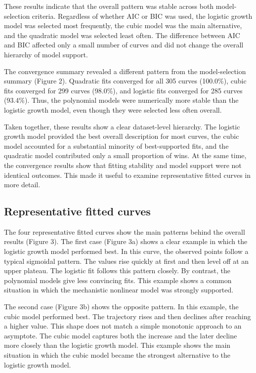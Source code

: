\documentclass[11pt]{article}
\begin{document}
These results indicate that the overall pattern was stable across both model-selection criteria. Regardless of whether AIC or BIC was used, the logistic growth model was selected most frequently, the cubic model was the main alternative, and the quadratic model was selected least often. The difference between AIC and BIC affected only a small number of curves and did not change the overall hierarchy of model support.



The convergence summary revealed a different pattern from the model-selection summary (Figure 2). Quadratic fits converged for all 305 curves (100.0\%), cubic fits converged for 299 curves (98.0\%), and logistic fits converged for 285 curves (93.4\%). Thus, the polynomial models were numerically more stable than the logistic growth model, even though they were selected less often overall.



Taken together, these results show a clear dataset-level hierarchy. The logistic growth model provided the best overall description for most curves, the cubic model accounted for a substantial minority of best-supported fits, and the quadratic model contributed only a small proportion of wins. At the same time, the convergence results show that fitting stability and model support were not identical outcomes. This made it useful to examine representative fitted curves in more detail.

\subsection{Representative fitted curves}

The four representative fitted curves show the main patterns behind the overall results (Figure 3). The first case (Figure 3a) shows a clear example in which the logistic growth model performed best. In this curve, the observed points follow a typical sigmoidal pattern. The values rise quickly at first and then level off at an upper plateau. The logistic fit follows this pattern closely. By contrast, the polynomial models give less convincing fits. This example shows a common situation in which the mechanistic nonlinear model was strongly supported.

The second case (Figure 3b) shows the opposite pattern. In this example, the cubic model performed best. The trajectory rises and then declines after reaching a higher value. This shape does not match a simple monotonic approach to an asymptote. The cubic model captures both the increase and the later decline more closely than the logistic growth model. This example shows the main situation in which the cubic model became the strongest alternative to the logistic growth model.
\end{document}
